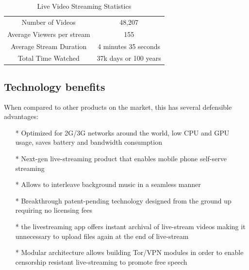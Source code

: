 \documentclass{article}
\begin{document}
\begin{table}[!htb]
\centering
\begin{tabular}{ |c|c| }
\hline
\rowcolor{lightgray} \multicolumn{2}{|c|}{Live Video Streaming Statistics} \\
\hline
Number of Videos & 48,207 \\
Average Viewers per stream & 155 \\
Average Stream Duration & 4 minutes 35 seconds \\
Total Time Watched & 37k days or 100 years \\
\hline
\end{tabular}
\caption{Live Video Streaming Statistics}
\label{table:2}
\end{table}

\subsection{Technology benefits}
When compared to other products on the market, this has several defensible advantages:
\begin{itemize}
\item[*]Optimized for 2G/3G networks around the world, low CPU and GPU usage, saves battery and bandwidth consumption
\item[*]Next-gen live-streaming product that enables mobile phone self-serve streaming 
\item[*]Allows to interleave background music in a seamless manner
\item[*]Breakthrough patent-pending technology designed from the ground up requiring no licensing fees
\item[*]the livestreaming app offers instant archival of live-stream videos making it unnecessary to upload files again at the end of live-stream
\item[*]Modular architecture allows building Tor/VPN modules in order to enable censorship resistant live-streaming to promote free speech
\end{itemize}
\end{document}
